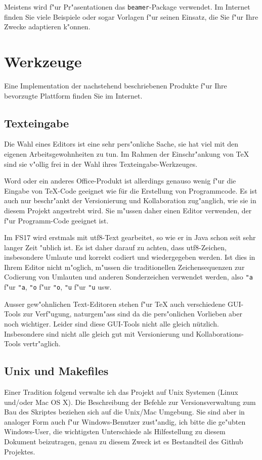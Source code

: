 \documentclass[a4paper,12pt]{article}
\begin{document}
Meistens wird f"ur Pr"asentationen das \texttt{beamer}-Package 
verwendet.
Im Internet finden Sie viele Beispiele oder sogar Vorlagen f"ur
seinen Einsatz, die Sie f"ur Ihre Zwecke adaptieren k"onnen.


\section{Werkzeuge\label{werkzeuge}}
Eine Implementation der nachstehend beschriebenen Produkte f"ur
Ihre bevorzugte Plattform finden Sie im Internet.

\subsection{Texteingabe}
Die Wahl eines Editors ist eine sehr pers"onliche Sache, sie hat
viel mit den eigenen Arbeitsgewohnheiten zu tun.
Im Rahmen der Einschr"ankung von \TeX{} sind sie v"ollig frei in der
Wahl ihres Texteingabe-Werkzeuges.

Word oder ein anderes Office-Produkt ist allerdings genauso wenig
f"ur die Eingabe von \TeX-Code geeignet wie für die Erstellung von
Programmcode.
Es ist auch nur beschr"ankt der Versionierung und Kollaboration
zug"anglich, wie sie in diesem Projekt angestrebt wird.
Sie m"ussen daher einen Editor verwenden, der f"ur Programm-Code
geeignet ist.

Im FS17 wird erstmals mit utf8-Text gearbeitet, so wie er in Java
schon seit sehr langer Zeit "ublich ist.
Es ist daher darauf zu achten, dass utf8-Zeichen, insbesondere 
Umlaute und korrekt codiert und wiedergegeben werden.
Ist dies in Ihrem Editor nicht m"oglich, m"ussen die traditionellen
Zeichensequenzen zur Codierung von Umlauten und anderen Sonderzeichen
verwendet werden, also \verb+"a+ f"ur \texttt{"a}, \verb+"o+ f"ur
\texttt{"o}, \verb+"u+ f"ur \texttt{"u} usw.

Ausser gew"ohnlichen Text-Editoren stehen f"ur \TeX{} auch verschiedene
GUI-Tools zur Ver\-f"u\-gung, naturgem"ass sind da die pers"onlichen
Vorlieben aber noch wichtiger.
Leider sind diese GUI-Tools nicht alle gleich nützlich.
Insbesondere sind nicht alle gleich gut mit Versionierung und
Kollaborations-Tools vertr"aglich.

\subsection{Unix und Makefiles}
Einer Tradition folgend verwalte ich das Projekt auf Unix Systemen
(Linux und/oder Mac OS X).
Die Beschreibung der Befehle zur Versionsverwaltung zum Bau des
Skriptes beziehen sich auf die Unix/Mac Umgebung.
Sie sind aber in analoger Form auch f"ur Windows-Benutzer zust"andig,
ich bitte die ge"ubten Windows-User, die wichtigsten Unterschiede
als Hilfestellung zu diesem Dokument beizutragen, genau zu diesem
Zweck ist es Bestandteil des Github Projektes.
\end{document}
